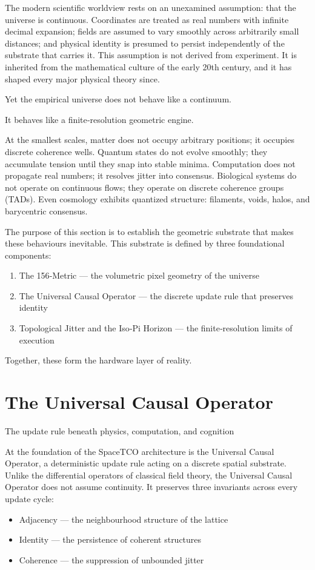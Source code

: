 \documentclass[reprint,amsmath,amssymb,aps,prl,floatfix]{revtex4-2}
\begin{document}
\begin{itemize}
The modern scientific worldview rests on an unexamined assumption: that the universe is continuous. Coordinates are treated as real numbers with infinite decimal expansion; fields are assumed to vary smoothly across arbitrarily small distances; and physical identity is presumed to persist independently of the substrate that carries it. This assumption is not derived from experiment. It is inherited from the mathematical culture of the early 20th century, and it has shaped every major physical theory since.
\medskip


Yet the empirical universe does not behave like a continuum.  
\medskip


It behaves like a finite‑resolution geometric engine.
\medskip


At the smallest scales, matter does not occupy arbitrary positions; it occupies discrete coherence wells. Quantum states do not evolve smoothly; they accumulate tension until they snap into stable minima. Computation does not propagate real numbers; it resolves jitter into consensus. Biological systems do not operate on continuous flows; they operate on discrete coherence groups (TADs). Even cosmology exhibits quantized structure: filaments, voids, halos, and barycentric consensus.
\medskip


The purpose of this section is to establish the geometric substrate that makes these behaviours inevitable. This substrate is defined by three foundational components:
\begin{enumerate}
\item The 156‑Metric — the volumetric pixel geometry of the universe  
\item The Universal Causal Operator — the discrete update rule that preserves identity  
\item Topological Jitter and the Iso‑Pi Horizon — the finite‑resolution limits of execution  
\end{enumerate}
\medskip

Together, these form the hardware layer of reality.

\section{The Universal Causal Operator}

The update rule beneath physics, computation, and cognition
\medskip

At the foundation of the SpaceTCO architecture is the Universal Causal Operator, a deterministic update rule acting on a discrete spatial substrate. Unlike the differential operators of classical field theory, the Universal Causal Operator does not assume continuity. It preserves three invariants across every update cycle:
\begin{itemize}
\item Adjacency — the neighbourhood structure of the lattice  
\item Identity — the persistence of coherent structures  
\item Coherence — the suppression of unbounded jitter  
\end{itemize}


\end{itemize}
\end{document}

